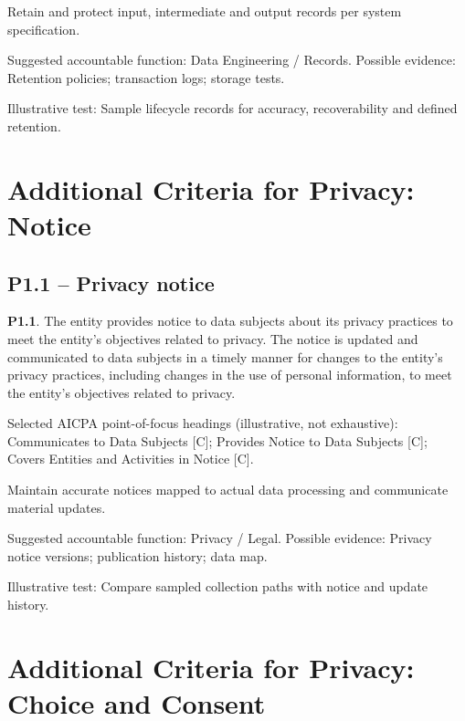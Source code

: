 \documentclass[10pt,oneside]{report}
\begin{document}
\begin{engineeringbox}
Retain and protect input, intermediate and output records per system specification.
\end{engineeringbox}
Suggested accountable function: Data Engineering / Records. Possible evidence: Retention policies; transaction logs; storage tests.

Illustrative test: Sample lifecycle records for accuracy, recoverability and defined retention.

\section{Additional Criteria for Privacy: Notice}
\subsection*{P1.1 -- Privacy notice}
\begin{aicpabox}
\textbf{P1.1}. The entity provides notice to data subjects about its privacy practices to meet the entity's objectives related to privacy. The notice is updated and communicated to data subjects in a timely manner for changes to the entity's privacy practices, including changes in the use of personal information, to meet the entity's objectives related to privacy.\par{}
\end{aicpabox}
Selected AICPA point-of-focus headings (illustrative, not exhaustive): Communicates to Data Subjects [C]; Provides Notice to Data Subjects [C]; Covers Entities and Activities in Notice [C].

\begin{engineeringbox}
Maintain accurate notices mapped to actual data processing and communicate material updates.
\end{engineeringbox}
Suggested accountable function: Privacy / Legal. Possible evidence: Privacy notice versions; publication history; data map.

Illustrative test: Compare sampled collection paths with notice and update history.

\section{Additional Criteria for Privacy: Choice and Consent}
\end{document}
